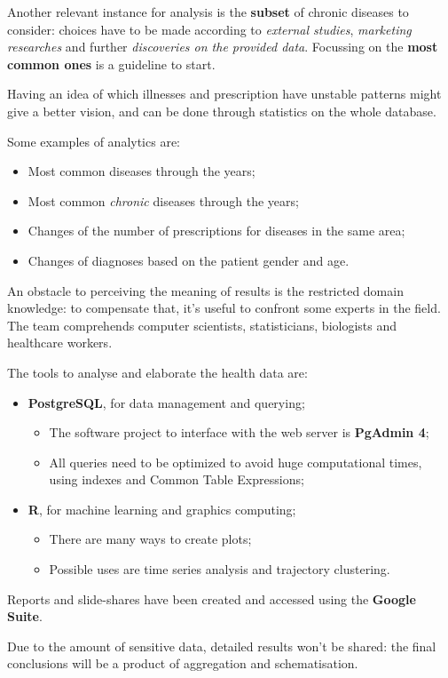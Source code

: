 Another relevant instance for analysis is the \textbf{subset} of chronic diseases to consider: choices have to be made according to \textit{external studies}, \textit{marketing researches} and further \textit{discoveries on the provided data}. Focussing on the \textbf{most common ones} is a guideline to start.

Having an idea of which illnesses and prescription have unstable patterns might give a better vision, and can be done through statistics on the whole database. 

Some examples of analytics are:
\begin{itemize}
	\item Most common diseases through the years;
	\item Most common \textit{chronic} diseases through the years;
	\item Changes of the number of prescriptions for diseases in the same area;
	\item Changes of diagnoses based on the patient gender and age.
\end{itemize}

An obstacle to perceiving the meaning of results is the restricted domain knowledge: to compensate that, it's useful to confront some experts in the field. The team comprehends computer scientists, statisticians, biologists and healthcare workers.

The tools to analyse and elaborate the health data are:
\begin{itemize}
	\item \textbf{PostgreSQL}, for data management and querying;
		\begin{itemize}
			\item The software project to interface with the web server is \textbf{PgAdmin 4};
			\item All queries need to be optimized to avoid huge computational times, using indexes and Common Table Expressions;
		\end{itemize}
	\item \textbf{R}, for machine learning and graphics computing;
	\begin{itemize}
		\item There are many ways to create plots;
		\item Possible uses are time series analysis and trajectory clustering.
	\end{itemize}
\end{itemize}

Reports and slide-shares have been created and accessed using the \textbf{Google Suite}.

Due to the amount of sensitive data, detailed results won't be shared: the final conclusions will be a product of aggregation and schematisation.